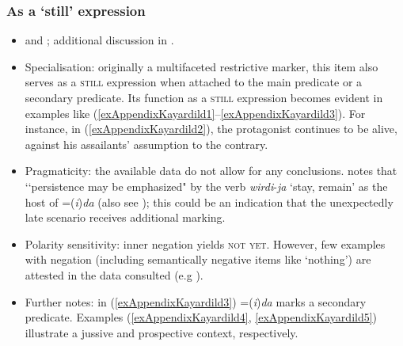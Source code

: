 \subsubsection{As a \lq{}still\rq{} expression}
\begin{itemize}
	\item \textcite[389–392]{Evans1995} and \textcite[181–183]{Round2009}; additional discussion in \textcite{SchultzeBerndt2002}.
	\item Specialisation: originally a multifaceted restrictive marker, this item also serves as a \textsc{still} expression when attached to the main predicate or a secondary predicate. Its function as a \textsc{still} expression becomes evident in examples like (\ref{exAppendixKayardild1}–\ref{exAppendixKayardild3}). For instance, in (\ref{exAppendixKayardild2}), the protagonist continues to be alive, against his assailants' assumption to the contrary.
	\item Pragmaticity: the available data do not allow for any conclusions. \textcite[392]{Evans1995} notes that \lq\lq persistence may be emphasized" by the verb \textit{wirdi}-\textit{ja} \lq stay, remain' as the host of \mbox{=(\textit{i})\textit{da}} (also see \cite[32]{Evans1995}); this could be an indication that the unexpectedly late scenario receives additional marking.
	\item Polarity sensitivity: inner negation yields \textsc{not yet}. However, few examples with negation (including semantically negative items like \lq nothing\rq{}) are attested in the data consulted (e.g \cite[183 ex. 3.66, 720 ex. A.27f]{Round2009}).
	\item Further notes: in (\ref{exAppendixKayardild3}) \mbox{=(\textit{i})\textit{da}} marks a secondary predicate. Examples (\ref{exAppendixKayardild4}, \ref{exAppendixKayardild5}) illustrate a jussive and prospective context, respectively.
\end{itemize}
